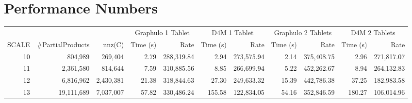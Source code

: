 \documentclass[conference]{IEEEtran}
\begin{document}
%
%


\balance


\section*{Performance Numbers}

\begin{table*}[htb]                                                                                            
\centering                                                                                                           
\begin{tabular}{|r|r|r|r|r|r|r|r|r|r|r|}                                                                             
\hline                                                                                                               
 & & & \multicolumn{2}{|c|}{Graphulo 1 Tablet} & \multicolumn{2}{|c|}{D4M 1 Tablet} & \multicolumn{2}{|c|}{Graphulo 2 Tablets} & \multicolumn{2}{|c|}{D4M 2 Tablets} \\
SCALE & \#PartialProducts & nnz(C) & Time (s) & Rate & Time (s) & Rate & Time (s) & Rate & Time (s) & Rate \\        
\hline                                                                                                               
10 & 804,989 & 269,404 & 2.79 & 288,319.84 & 2.94 & 273,575.94 & 2.14 & 375,408.75 & 2.96 & 271,817.07 \\            
\hline                                                                                                               
11 & 2,361,580 & 814,644 & 7.59 & 310,885.56 & 8.85 & 266,699.94 & 5.22 & 452,262.67 & 8.94 & 264,132.83 \\          
\hline                                                                                                               
12 & 6,816,962 & 2,430,381 & 21.38 & 318,844.63 & 27.30 & 249,633.32 & 15.39 & 442,786.38 & 37.25 & 182,983.58 \\    
\hline                                                                                                               
13 & 19,111,689 & 7,037,007 & 57.82 & 330,486.24 & 155.58 & 122,834.05 & 54.16 & 352,846.59 & 180.27 & 106,014.96 \\ 

\end{tabular}
\end{table*}
\end{document}
